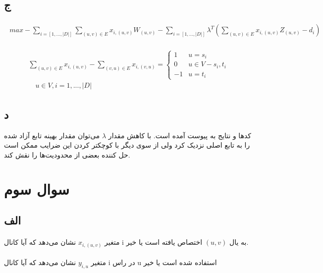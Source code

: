 \documentclass[paper=a4, fontsize=11pt]{article}
\numberwithin{equation}{section} %
\numberwithin{figure}{section} %
\numberwithin{table}{section} %
\begin{document}
\subsection{ج}
\begin{align}
\begin{split}
	max -\sum_{i = [1, ..., |D|]}\sum_{(u,v) \in E} x_{i,(u,v)}W_{(u,v)} - \sum_{i = [1, ..., |D|]}\lambda^T(\sum_{(u,v) \in E} x_{i,(u,v)}Z_{(u,v)} - d_i)
\end{split}
\end{align}

\begin{align}
\begin{split}
	\sum_{(u,v) \in E} x_{i,(u,v)} - \sum_{(v,u) \in E} x_{i,(v,u)} = 
	\left \{
		\begin{array}{cc}
			1 & u = s_i\\
			0 & u \in V - {s_i, t_i}\\
			-1 & u = t_i
		\end{array}
	\right.
	\\
	\quad u \in V, i = {1, ..., |D|}
\end{split}
\end{align}

\subsection{د}
کدها و نتایج به پیوست آمده است.
با کاهش مقدار $\lambda$ می‌توان مقدار بهینه تابع آزاد شده را
به تابع اصلی نزدیک کرد ولی از سوی دیگر با کوچکتر کردن این ضرایب
ممکن است حل کننده بعضی از محدودیت‌ها را نقش کند.

\section{سوال سوم}
\subsection{الف}
\paragraph{}
متغیر $x_{i,(u,v)}$ نشان می‌دهد که آیا کانال i به یال $(u,v)$
اختصاص یافته است یا خیر.

\paragraph{}
متغیر $y_{i,u}$ نشان می‌دهد
که آیا کانال i در راس u استفاده شده است یا خیر
\end{document}
